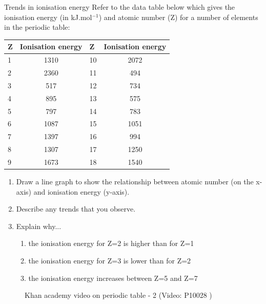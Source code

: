 \begin{exercises}{Trends in ionisation energy}
Refer to the data table below which gives the ionisation energy (in kJ.mol$^{-1}$) and atomic number (Z) for a number of elements in the periodic table:\\

\begin{center}
\begin{tabular}{|l|c|l|c|}\hline
\textbf{Z} & Ionisation energy & \textbf{Z} & Ionisation energy \\\hline
1 & 1310 & 10 & 2072 \\\hline
2 & 2360 & 11 & 494 \\\hline
3 & 517 & 12 & 734 \\\hline
4 & 895 & 13 & 575 \\\hline
5 & 797 & 14 & 783 \\\hline
6 & 1087 & 15 & 1051 \\\hline
7 & 1397 & 16 & 994 \\\hline
8 & 1307 & 17 & 1250 \\\hline
9 & 1673 & 18 & 1540 \\\hline
\end{tabular}
\end{center}

\begin{enumerate}[noitemsep, label=\textbf{\arabic*}. ]
\item{Draw a line graph to show the relationship between atomic number (on the x-axis) and ionisation energy (y-axis).}
\item{Describe any trends that you observe.}
\item{Explain why...
	\begin{enumerate}[noitemsep, label=\textbf{\arabic*}. ]
	\item{the ionisation energy for Z=2 is higher than for Z=1}
	\item{the ionisation energy for Z=3 is lower than for Z=2}
	\item{the ionisation energy increases between Z=5 and Z=7}
	\end{enumerate}
}
\end{enumerate}
\end{exercises}
        \par 
        \label{m38757*eip-6}
    \setcounter{subfigure}{0}
	\begin{figure}[H] %
    \textnormal{Khan academy video on periodic table - 2}\vspace{.1in} \nopagebreak
  \label{m38757*yt-media3}\label{m38757*yt-video3}
             { (Video:  P10028 )}
      \vspace{2pt}
    \vspace{.1in}
 \end{figure}       \par 
